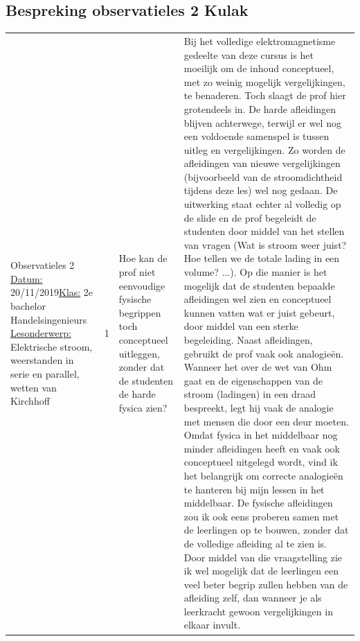 \documentclass[a4paper,12pt,twoside]{article}%
\begin{document}
\begin{landscape}
	
		\subsection{Bespreking observatieles 2 Kulak}
		\begin{tabularx}{1.56\textwidth}{|Q{0.25\textwidth}|Q{0.1\textwidth}|Q{0.25\textwidth}|Q{0.85\textwidth}|}\hline
			Observatieles 2 \newline \underline{Datum:} 20/11/2019\newline \underline{Klas:} 2e bachelor Handelsingenieurs \newline \underline{Lesonderwerp:}  Elektrische stroom, weerstanden in serie en parallel, wetten van Kirchhoff& 1 & Hoe kan de prof niet eenvoudige fysische begrippen toch conceptueel uitleggen, zonder dat de studenten de harde fysica zien? & Bij het volledige elektromagnetisme gedeelte van deze cursus is het moeilijk om de inhoud conceptueel, met zo weinig mogelijk vergelijkingen, te benaderen. Toch slaagt de prof hier grotendeels in. De harde afleidingen blijven achterwege, terwijl er wel nog een voldoende samenspel is tussen uitleg en vergelijkingen. Zo worden de afleidingen van nieuwe vergelijkingen (bijvoorbeeld van de stroomdichtheid tijdens deze les) wel nog gedaan. De uitwerking staat echter al volledig op de slide en de prof begeleidt de studenten door middel van het stellen van vragen (Wat is stroom weer juist? Hoe tellen we de totale lading in een volume? ...). Op die manier is het mogelijk dat de studenten bepaalde afleidingen wel zien en conceptueel kunnen vatten wat er juist gebeurt, door middel van een sterke begeleiding. Naast afleidingen, gebruikt de prof vaak ook analogieën. Wanneer het over de wet van Ohm gaat en de eigenschappen van de stroom (ladingen) in een draad bespreekt, legt hij vaak de analogie met mensen die door een deur moeten. \newline Omdat fysica in het middelbaar nog minder afleidingen heeft en vaak ook conceptueel uitgelegd wordt, vind ik het belangrijk om correcte analogieën te hanteren bij mijn lessen in het middelbaar. De fysische afleidingen zou ik ook eens proberen samen met de leerlingen op te bouwen, zonder dat de volledige afleiding al te zien is. Door middel van die vraagstelling zie ik wel mogelijk dat de leerlingen een veel beter begrip zullen hebben van de afleiding zelf, dan wanneer je als leerkracht gewoon vergelijkingen in elkaar invult. \\
			

\end{tabularx}
\end{landscape}
\end{document}

